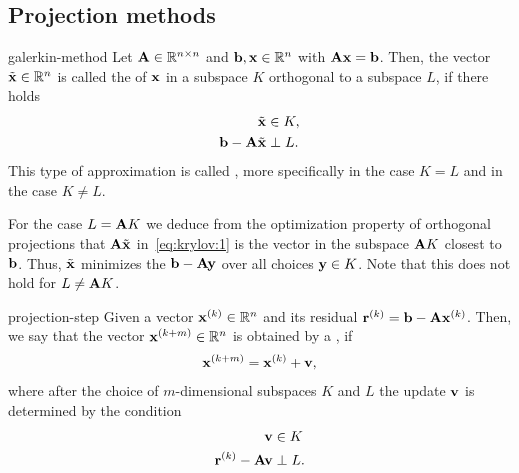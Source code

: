 \subsection{Projection methods}

\begin{Definition}{galerkin-method}
  Let $\mathbf A\in\mathbb R^{n\times n}$ and $\mathbf b, \mathbf x\in\mathbb R^n$ with $\mathbf A\mathbf x=\mathbf b$. Then,
  the vector $\tilde{\mathbf x}\in\mathbb R^n$ is called the  of $\mathbf x$ in a subspace $K$ orthogonal to a subspace
  $L$, if there holds
  \begin{align}
    \tilde{\mathbf x} &\in K,\\
    \mathbf b-\mathbf A\tilde{\mathbf x} &\perp L.
                         \label{eq:krylov:1}
  \end{align}
  This type of approximation is called , more
  specifically  in the case $K=L$ and
   in the case $K\neq L$.
\end{Definition}

\begin{remark}
  For the case $L=\mathbf A K$ we deduce from the optimization property of
  orthogonal projections that $\mathbf A\tilde {\mathbf x}$ in~\eqref{eq:krylov:1}
  is the vector in the subspace $\mathbf A K$ closest to $\mathbf b$. Thus,
  $\tilde{\mathbf x}$ minimizes the  $\mathbf b-\mathbf A\mathbf y$ over
  all choices $\mathbf y\in K$.
 Note that this does not hold for $L\neq \mathbf A K$.
\end{remark}

\begin{Definition}{projection-step}
  Given a vector $\mathbf x^{(k)}\in\mathbb R^n$ and its residual
  $\mathbf r^{(k)}=\mathbf b-\mathbf A\mathbf x^{(k)}$. Then, we say that the vector
  $\mathbf x^{(k+m)}\in\mathbb R^n$ is obtained by a , if
  \begin{gather}
    \mathbf x^{(k+m)} = \mathbf x^{(k)} + \mathbf v,
  \end{gather}
  where after the choice of $m$-dimensional subspaces $K$ and $L$ the update $\mathbf v$ is
  determined by the condition
  \begin{align}
    \mathbf v &\in K\\
    \mathbf r^{(k)} - \mathbf A\mathbf v &\perp L.
  \end{align}
\end{Definition}

